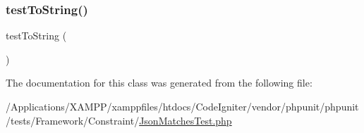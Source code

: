 \subsubsection{\texorpdfstring{test\+To\+String()}{testToString()}}
{\footnotesize\ttfamily test\+To\+String (\begin{DoxyParamCaption}{ }\end{DoxyParamCaption})}



The documentation for this class was generated from the following file\+:\begin{DoxyCompactItemize}
\item 
/\+Applications/\+X\+A\+M\+P\+P/xamppfiles/htdocs/\+Code\+Igniter/vendor/phpunit/phpunit/tests/\+Framework/\+Constraint/\mbox{\hyperlink{_json_matches_test_8php}{Json\+Matches\+Test.\+php}}\end{DoxyCompactItemize}
